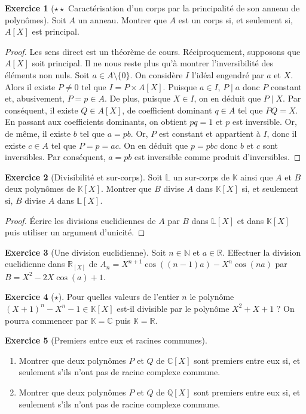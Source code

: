 \documentclass[french]{book}
\newcommand{\N}{\mathbb{N}}
\newcommand{\Q}{\mathbb{Q}}
\newcommand{\R}{\mathbb{R}}
\newcommand{\C}{\mathbb{C}}
\newcommand{\K}{\mathbb{K}}
\renewcommand{\L}{\mathbb{L}}
\theoremstyle{definition}
\newtheorem{ex}{Exercice}[chapter]
\theoremstyle{theorem}
\theoremstyle{remark}
\begin{document}
\begin{ex}[$\star\star$ Caractérisation d'un corps par la principalité de son anneau de polynômes]
	Soit $A$ un anneau. Montrer que $A$ est un corps si, et seulement si, $A[X]$ est principal.
\end{ex}

\begin{proof}
	Les sens direct est un théorème de cours. Réciproquement, supposons que $A[X]$ soit principal. Il ne nous reste plus qu'à montrer l'inversibilité des éléments non nuls. Soit $a\in A\setminus\{0\}$. On considère $I$ l'idéal engendré par $a$ et $X$. Alors il existe $P\ne 0$ tel que $I=P\times A[X]$. Puisque $a\in I$, $P\mid a$ donc $P$ constant et, abusivement, $P=p\in A$. De plus, puisque $X\in I$, on en déduit que $P\mid X$. Par conséquent, il existe $Q\in A[X]$, de coefficient dominant $q\in A$ tel que $PQ=X$. En passant aux coefficients dominants, on obtient $pq=1$ et $p$ est inversible. Or, de même, il existe $b$ tel que $a=pb$. Or, $P$ est constant et appartient à $I$, donc il existe $c\in A$ tel que $P=p=ac$. On en déduit que $p=pbc$ donc $b$ et $c$ sont inversibles.  Par conséquent, $a=pb$ est inversible comme produit d'inversibles. 
\end{proof}

\begin{ex}[Divisibilité et sur-corps]
	Soit $\L$ un sur-corps de $\K$ ainsi que $A$ et $B$ deux polynômes de $\K[X]$. Montrer que $B$ divise $A$ dans $\K[X]$ si, et seulement si, $B$ divise $A$ dans $\L[X]$.
\end{ex}

\begin{proof}
	Écrire les divisions euclidiennes de $A$ par $B$ dans $\L[X]$ et dans $\K[X]$ puis utiliser un argument d'unicité.
\end{proof}

\begin{ex}[Une division euclidienne]
	Soit $n\in\N$ et $a\in\R$. Effectuer la division euclidienne dans $\R_[X]$ de $A_n=X^{n+1}\cos((n-1)a)-X^n\cos(na)$ par $B=X^2-2X\cos(a)+1$.
\end{ex}

\begin{ex}[$\star$]
	Pour quelles valeurs de l'entier $n$ le polynôme $(X+1)^n-X^n-1\in\K[X]$ est-il divisible par le polynôme $X^2+X+1$ ? On pourra commencer par $\K=\C$ puis $\K=\R$.
\end{ex}

\begin{ex}[Premiers entre eux et racines communes]
	\begin{enumerate}
		\item Montrer que deux polynômes $P$ et $Q$ de $\C[X]$ sont premiers entre eux si, et seulement s'ils n'ont pas de racine complexe commune.
		\item Montrer que deux polynômes $P$ et $Q$ de $\Q[X]$ sont premiers entre eux si, et seulement s'ils n'ont pas de racine complexe commune.
	\end{enumerate}
\end{ex}
\end{document}
